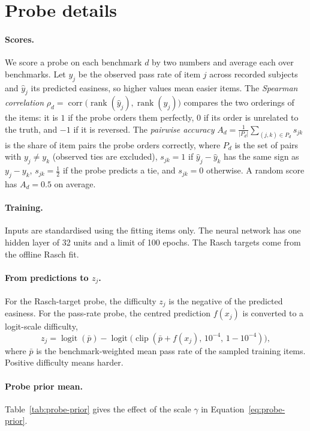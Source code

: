 \documentclass{article}
\begin{document}
\section{Probe details}\label{app:probes}
\paragraph{Scores.} We score a probe on each benchmark $d$ by two numbers and average each over benchmarks. Let $y_j$ be the observed pass rate of item $j$ across recorded subjects and $\hat y_j$ its predicted easiness, so higher values mean easier items. The \emph{Spearman correlation} $\rho_d=\operatorname{corr}\big(\operatorname{rank}(\hat y_j),\operatorname{rank}(y_j)\big)$ compares the two orderings of the items: it is $1$ if the probe orders them perfectly, $0$ if its order is unrelated to the truth, and $-1$ if it is reversed. The \emph{pairwise accuracy} $A_d=\frac{1}{|P_d|}\sum_{(j,k)\in P_d}s_{jk}$ is the share of item pairs the probe orders correctly, where $P_d$ is the set of pairs with $y_j\neq y_k$ (observed ties are excluded), $s_{jk}=1$ if $\hat y_j-\hat y_k$ has the same sign as $y_j-y_k$, $s_{jk}=\tfrac12$ if the probe predicts a tie, and $s_{jk}=0$ otherwise. A random score has $A_d=0.5$ on average.

\paragraph{Training.} Inputs are standardised using the fitting items only. The neural network has one hidden layer of 32 units and a limit of 100 epochs. The Rasch targets come from the offline Rasch fit.

\paragraph{From predictions to $z_j$.} For the Rasch-target probe, the difficulty $z_j$ is the negative of the predicted easiness. For the pass-rate probe, the centred prediction $f(x_j)$ is converted to a logit-scale difficulty,
\begin{equation*}
z_j=\operatorname{logit}(\bar p)-\operatorname{logit}\!\big(\operatorname{clip}(\bar p+f(x_j),\,10^{-4},\,1-10^{-4})\big),
\end{equation*}
where $\bar p$ is the benchmark-weighted mean pass rate of the sampled training items. Positive difficulty means harder.

\paragraph{Probe prior mean.} Table~\ref{tab:probe-prior} gives the effect of the scale $\gamma$ in Equation~\eqref{eq:probe-prior}.
\end{document}
